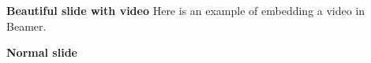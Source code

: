 \documentclass[aspectratio=169,10pt]{beamer}
\author{\getStudentName}
\title{\getProjName}
\date{October 10, 2023}
\begin{document}

\begin{frame}{\textbf{Beautiful slide with video}}
	Here is an example of embedding a video in Beamer.
	\begin{center}
	\end{center}
\end{frame}

\begin{frame}{\textbf{Normal slide}}
	
\end{frame}

\end{document}
